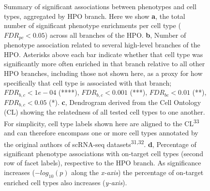 \documentclass[
]{agujournal2019}
\begin{document}
\label{cell-fig-summary}
\begin{figure}[H]


\caption{\label{fig-summary}Summary of significant associations between
phenotypes and cell types, aggregated by HPO branch. Here we show
\textbf{a}, the total number of significant phenotype enrichments per
cell type (\(FDR_{pc}<0.05\)) across all branches of the HPO.
\textbf{b}, Number of phenotype association related to several
high-level branches of the HPO. Asterisks above each bar indicate
whether that cell type was significantly more often enriched in that
branch relative to all other HPO branches, including those not shown
here, as a proxy for how specifically that cell type is associated with
that branch; \(FDR _{b,c}<1e-04\) (****), \(FDR _{b,c}<0.001\) (***),
\(FDR_{bc}<0.01\) (**), \(FDR _{b,c}<0.05\) (*). \textbf{c}, Dendrogram
derived from the Cell Ontology (CL) showing the relatedness of all
tested cell types to one another. For simplicity, cell type labels shown
here are aligned to the CL\textsuperscript{33} and can therefore
encompass one or more cell types annotated by the original authors of
scRNA-seq datasets\textsuperscript{31,32}. \textbf{d}, Percentage of
significant phenotype associations with on-target cell types (second row
of facet labels), respective to the HPO branch. As significance
increases (\(-log_{10}(p)\) along the \emph{x-axis}) the percentage of
on-target enriched cell types also increases (\emph{y-axis}).}

\end{figure}%
\end{document}
